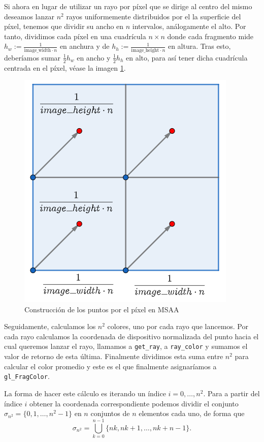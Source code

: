 Si ahora en lugar de utilizar un rayo por píxel que se dirige al centro del mismo deseamos lanzar $n^2$ rayos uniformemente distribuidos por el la superficie del píxel, tenemos que dividir su ancho en $n$ intervalos, análogamente el alto. Por tanto, dividimos cada píxel en una cuadrícula $n\times n$ donde cada fragmento mide $h_w:=\frac{1}{\mathrm{image\_width}\cdot n}$ en anchura y de $h_h:=\frac{1}{\mathrm{image\_height}\cdot n}$ en altura. Tras esto, deberíamos sumar $\frac{1}{2}h_w$ en ancho y $\frac{1}{2}h_h$ en alto, para así tener dicha cuadrícula centrada en el píxel, véase la imagen \ref{fig:MSAA}.

\begin{figure} [ht]
    \centering
    \includegraphics[scale = 0.45]{img/C7/MSAA.png}
    \caption{Construcción de los puntos por el píxel en MSAA}
    \label{fig:MSAA}
\end{figure}

Seguidamente, calculamos los $n^2$ colores, uno por cada rayo que lancemos. Por cada rayo calculamos la coordenada de dispositivo normalizada del punto hacia el cual queremos lanzar el rayo, llamamos a \verb|get_ray|, a \verb|ray_color| y sumamos el valor de retorno de esta última. Finalmente dividimos esta suma entre $n^2$ para calcular el color promedio y este es el que finalmente asignaríamos a \verb|gl_FragColor|.

La forma de hacer este cálculo es iterando un índice $i=0,\dots,n^2$. Para a partir del índice $i$ obtener la coordenada correspondiente podemos dividir el conjunto $\sigma_{n^2}=\{0,1,\dots,n^2-1\}$ en $n$ conjuntos de $n$ elementos cada uno, de forma que
$$
\sigma_{n^2} = \bigcup_{k=0}^{n-1} \{nk, nk+1, \dots, nk+n-1\}.
$$

